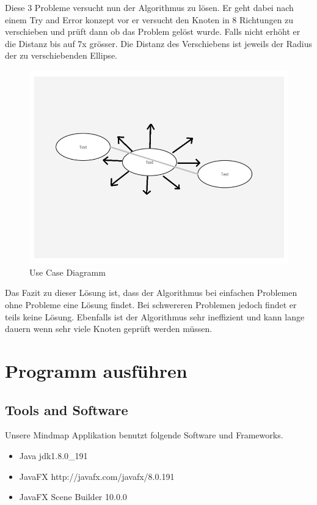 Diese 3 Probleme versucht nun der Algorithmus zu lösen. Er geht dabei nach einem Try and Error konzept vor
er versucht den Knoten in 8 Richtungen zu verschieben und prüft dann ob das Problem gelöst wurde. Falls nicht erhöht er die Distanz bis auf 7x grösser. Die Distanz des Verschiebens ist jeweils der Radius der zu verschiebenden Ellipse. 

\begin{figure}[H]
	\centering
		\includegraphics[scale=0.5]{images/solving.PNG}
	\caption{Use Case Diagramm}
	\label{fig:use_case_diagramm}
\end{figure}

Das Fazit zu dieser Lösung ist, dass der Algorithmus bei einfachen Problemen ohne Probleme eine Lösung findet. Bei schwereren Problemen jedoch findet er teils keine Lösung. Ebenfalls ist der Algorithmus sehr ineffizient und kann lange dauern wenn sehr viele Knoten geprüft werden müssen. 

\section{Programm ausführen}
\label{sec:run_program}

\subsection{Tools and Software}
\label{subsec:tools}
Unsere Mindmap Applikation benutzt folgende Software und Frameworks.
\begin{itemize}
\item Java jdk1.8.0\_{}191
\item JavaFX http://javafx.com/javafx/8.0.191
\item JavaFX Scene Builder 10.0.0
\end{itemize}

